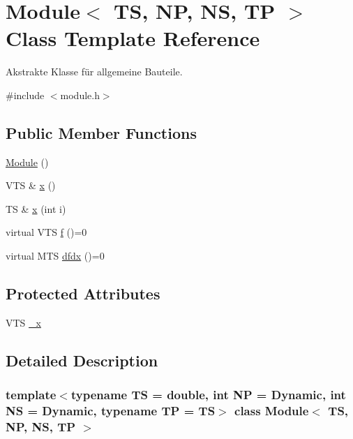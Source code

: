 \hypertarget{class_module}{}\section{Module$<$ TS, NP, NS, TP $>$ Class Template Reference}
\label{class_module}


Akstrakte Klasse für allgemeine Bauteile.  




{\ttfamily \#include $<$module.\+h$>$}

\subsection*{Public Member Functions}
\begin{DoxyCompactItemize}
\item 
\mbox{\hyperlink{class_module_a40ec09f0f85314f2b542077d83567d7a}{Module}} ()
\item 
V\+TS \& \mbox{\hyperlink{class_module_a923f4a0593063f6df53e165cc1db4891}{x}} ()
\item 
TS \& \mbox{\hyperlink{class_module_a3f448820efd272b2812e0ccc697c42de}{x}} (int i)
\item 
virtual V\+TS \mbox{\hyperlink{class_module_a2499211a4fc52bc33512761ea7fb3c62}{f}} ()=0
\item 
virtual M\+TS \mbox{\hyperlink{class_module_a0762d7cbad2a73d5eff3f2f1155e8e33}{dfdx}} ()=0
\end{DoxyCompactItemize}
\subsection*{Protected Attributes}
\begin{DoxyCompactItemize}
\item 
V\+TS \mbox{\hyperlink{class_module_a518d0262a48d4bc3647adddefd66897d}{\+\_\+x}}
\end{DoxyCompactItemize}


\subsection{Detailed Description}
\subsubsection*{template$<$typename TS = double, int NP = Dynamic, int NS = Dynamic, typename TP = TS$>$\newline
class Module$<$ T\+S, N\+P, N\+S, T\+P $>$}

